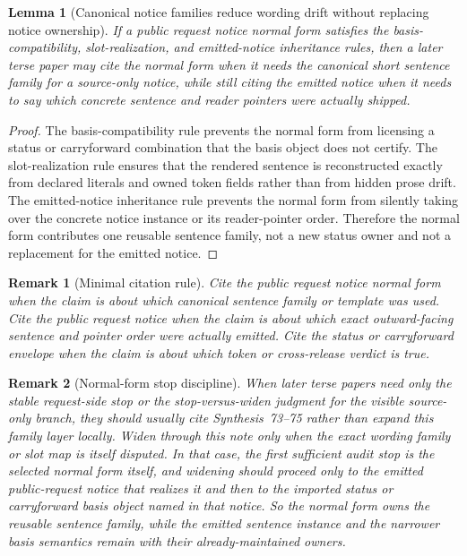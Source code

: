 \documentclass[11pt]{article}
\newtheorem{lemma}{Lemma}
\newtheorem{remark}{Remark}
\begin{document}
\begin{lemma}[Canonical notice families reduce wording drift without replacing notice ownership]
If a public request notice normal form satisfies the basis-compatibility, slot-realization, and emitted-notice inheritance rules, then a later terse paper may cite the normal form when it needs the canonical short sentence family for a source-only notice, while still citing the emitted notice when it needs to say which concrete sentence and reader pointers were actually shipped.
\end{lemma}

\begin{proof}
The basis-compatibility rule prevents the normal form from licensing a status or carryforward combination that the basis object does not certify.
The slot-realization rule ensures that the rendered sentence is reconstructed exactly from declared literals and owned token fields rather than from hidden prose drift.
The emitted-notice inheritance rule prevents the normal form from silently taking over the concrete notice instance or its reader-pointer order.
Therefore the normal form contributes one reusable sentence family, not a new status owner and not a replacement for the emitted notice.\qedhere
\end{proof}

\begin{remark}[Minimal citation rule]
Cite the public request notice normal form when the claim is about \emph{which canonical sentence family or template was used}.
Cite the public request notice when the claim is about \emph{which exact outward-facing sentence and pointer order were actually emitted}.
Cite the status or carryforward envelope when the claim is about \emph{which token or cross-release verdict is true}.
\end{remark}

\begin{remark}[Normal-form stop discipline]
When later terse papers need only the stable request-side stop or the stop-versus-widen judgment for the visible source-only branch, they should usually cite Synthesis~73--75 rather than expand this family layer locally.
Widen through this note only when the exact wording family or slot map is itself disputed. In that case, the first sufficient audit stop is the selected normal form itself, and widening should proceed only to the emitted public-request notice that realizes it and then to the imported status or carryforward basis object named in that notice.
So the normal form owns the reusable sentence family, while the emitted sentence instance and the narrower basis semantics remain with their already-maintained owners.
\end{remark}
\end{document}

